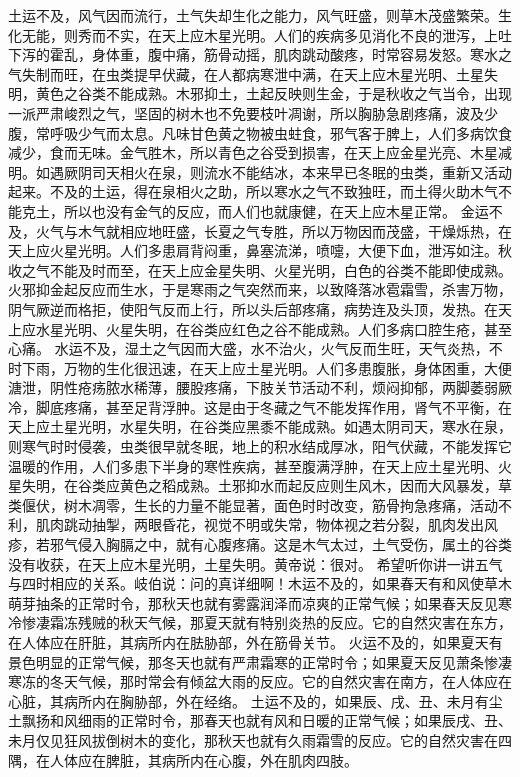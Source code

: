 \documentclass[a4paper,12pt,UTF8,twoside]{ctexbook}
\begin{document}
土运不及，风气因而流行，土气失却生化之能力，风气旺盛，则草木茂盛繁荣。生化无能，则秀而不实，在天上应木星光明。人们的疾病多见消化不良的泄泻，上吐下泻的霍乱，身体重，腹中痛，筋骨动摇，肌肉跳动酸疼，时常容易发怒。寒水之气失制而旺，在虫类提早伏藏，在人都病寒泄中满，在天上应木星光明、土星失明，黄色之谷类不能成熟。木邪抑土，土起反映则生金，于是秋收之气当令，出现一派严肃峻烈之气，坚固的树木也不免要枝叶凋谢，所以胸胁急剧疼痛，波及少腹，常呼吸少气而太息。凡味甘色黄之物被虫蛀食，邪气客于脾上，人们多病饮食减少，食而无味。金气胜木，所以青色之谷受到损害，在天上应金星光亮、木星减明。如遇厥阴司天相火在泉，则流水不能结冰，本来早已冬眠的虫类，重新又活动起来。不及的土运，得在泉相火之助，所以寒水之气不致独旺，而土得火助木气不能克土，所以也没有金气的反应，而人们也就康健，在天上应木星正常。
金运不及，火气与木气就相应地旺盛，长夏之气专胜，所以万物因而茂盛，干燥烁热，在天上应火星光明。人们多患肩背闷重，鼻塞流涕，喷嚏，大便下血，泄泻如注。秋收之气不能及时而至，在天上应金星失明、火星光明，白色的谷类不能即使成熟。火邪抑金起反应而生水，于是寒雨之气突然而来，以致降落冰雹霜雪，杀害万物，阴气厥逆而格拒，使阳气反而上行，所以头后部疼痛，病势连及头顶，发热。在天上应水星光明、火星失明，在谷类应红色之谷不能成熟。人们多病口腔生疮，甚至心痛。
水运不及，湿土之气因而大盛，水不治火，火气反而生旺，天气炎热，不时下雨，万物的生化很迅速，在天上应土星光明。人们多患腹胀，身体困重，大便溏泄，阴性疮疡脓水稀薄，腰股疼痛，下肢关节活动不利，烦闷抑郁，两脚萎弱厥冷，脚底疼痛，甚至足背浮肿。这是由于冬藏之气不能发挥作用，肾气不平衡，在天上应土星光明，水星失明，在谷类应黑黍不能成熟。如遇太阴司天，寒水在泉，则寒气时时侵袭，虫类很早就冬眠，地上的积水结成厚冰，阳气伏藏，不能发挥它温暖的作用，人们多患下半身的寒性疾病，甚至腹满浮肿，在天上应土星光明、火星失明，在谷类应黄色之稻成熟。土邪抑水而起反应则生风木，因而大风暴发，草类偃伏，树木凋零，生长的力量不能显著，面色时时改变，筋骨拘急疼痛，活动不利，肌肉跳动抽掣，两眼昏花，视觉不明或失常，物体视之若分裂，肌肉发出风疹，若邪气侵入胸膈之中，就有心腹疼痛。这是木气太过，土气受伤，属土的谷类没有收获，在天上应木星光明，土星失明。黄帝说：很对。
希望听你讲一讲五气与四时相应的关系。岐伯说：问的真详细啊！木运不及的，如果春天有和风使草木萌芽抽条的正常时令，那秋天也就有雾露润泽而凉爽的正常气候；如果春天反见寒冷惨凄霜冻残贼的秋天气候，那夏天就有特别炎热的反应。它的自然灾害在东方，在人体应在肝脏，其病所内在胠胁部，外在筋骨关节。
火运不及的，如果夏天有景色明显的正常气候，那冬天也就有严肃霜寒的正常时令；如果夏天反见萧条惨凄寒冻的冬天气候，那时常会有倾盆大雨的反应。它的自然灾害在南方，在人体应在心脏，其病所内在胸胁部，外在经络。
土运不及的，如果辰、戌、丑、未月有尘土飘扬和风细雨的正常时令，那春天也就有风和日暖的正常气候；如果辰戌、丑、未月仅见狂风拔倒树木的变化，那秋天也就有久雨霜雪的反应。它的自然灾害在四隅，在人体应在脾脏，其病所内在心腹，外在肌肉四肢。
\end{document}
